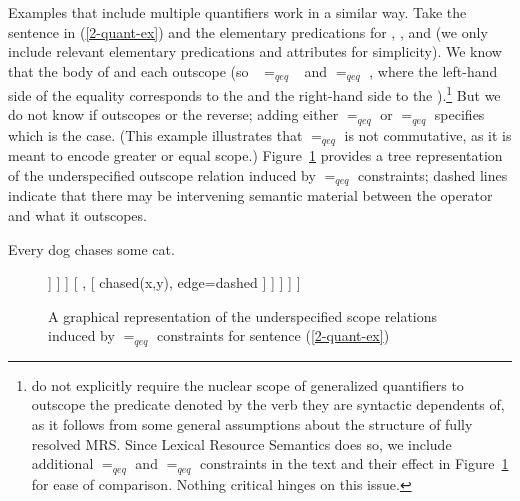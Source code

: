 \documentclass[output=paper,biblatex,babelshorthands,newtxmath,draftmode,colorlinks,citecolor=brown]{langscibook}
\begin{document}
Examples that include multiple quantifiers work in a similar way. Take the sentence in (\ref{2-quant-ex}) and the elementary predications for , , and  (we only include relevant elementary predications and attributes for simplicity). We know that the body of  and  each outscope  (so \mbox{ $=_{qeq}$ } and  $=_{qeq}$ , where the left-hand side of the equality corresponds to the  and the right-hand side to the ).\footnote{\citet{Copestakeetal2005} do not explicitly require the nuclear scope of generalized quantifiers to outscope the predicate denoted by the verb they are syntactic dependents of, as it follows from some general assumptions about the structure of fully resolved MRS. Since Lexical Resource Semantics does so, we include additional  $=_{qeq}$  and  $=_{qeq}$  constraints in the text and their effect in Figure~\ref{fig:MRS-tree} for ease of comparison. Nothing critical hinges on this issue.} But we do not know if  outscopes  or the reverse; adding either   $=_{qeq}$  or  $=_{qeq}$  specifies which is the case. (This example illustrates that $=_{qeq}$ is not commutative, as it is meant to encode greater or equal scope.) Figure~\ref{fig:MRS-tree} provides a tree representation of the underspecified outscope relation induced by $=_{qeq}$ constraints; dashed lines indicate that there may be intervening semantic material between the operator and what it outscopes.

\begin{exe}
\ex\label{2-quant-ex}Every dog chases some cat.
\ex\label{2-quant-sem}
\end{exe}

\begin{figure}
\begin{forest}
[ top
[ {chased(x,y)}, edge=dashed
	[ every, no edge
		[ dog(x), edge=dashed ]
		[ {}, no edge 
				[ some(y), no edge 
					[ cat (y), edge=dashed ] 
					[ {}, [ {chased(x,y)}, edge=dashed	 ] ] ] ] 
		[ {}, [ {chased(x,y)}, edge=dashed ] ]			
					] 
	]
	]
\end{forest}
\caption{\label{fig:MRS-tree}A graphical representation of the underspecified scope relations induced by $=_{qeq}$ constraints for sentence (\ref{2-quant-ex})}
\end{figure}
\end{document}
